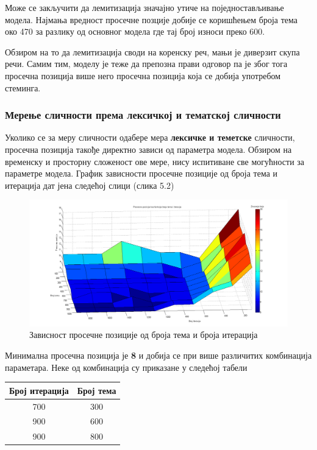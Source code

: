 Може се закључити да лемитизација значајно утиче на поједностављивање модела. Најмања вредност просечне позције добије се коришћењем броја тема око  470 за разлику од основног модела где тај број износи преко 600.

Обзиром на то да лемитизација своди на коренску реч, мањи је диверзит скупа речи. Самим тим, моделу је теже да препозна прави одговор па је због тога просечна позиција више него просечна позиција која се добија употребом стеминга.



\subsubsection{Мерење сличности према лексичкој и тематској сличности}
	
Уколико се за меру сличности одабере мера  \textbf{лексичке и теметске} сличности, просечна позиција такође директно зависи од параметра модела. Обзиром на временску и просторну сложеност ове мере, нису испитиване све могућности за параметре модела. График зависности просечне позиције од броја тема и итерација дат јена следећој слици (слика 5.2)

		\begin{figure}[H]
    \centering
   \includegraphics[scale=0.3]{./Slike/distLemNoSyn.png} 
	\caption{Зависност просечне позиције од броја тема и броја итерација}
	\label{fig:slika1}
\end{figure}

Минимална просечна позиција је \textbf{8} и добија се при више различитих комбинација параметара. Неке од комбинација су приказане у следећој табели

\begin{center}
\begin{tabular}{|c|c|}
\hline
Број итерација & Број тема \\
\hline\hline
700 & 300 \\
900 & 600 \\
900 & 800 \\
\hline
\end{tabular}

\end{center}




